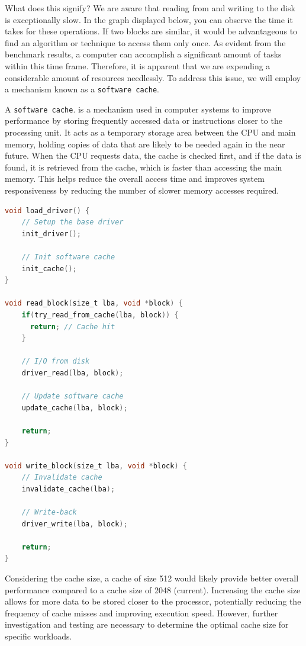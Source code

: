 What does this signify? We are aware that reading from and writing to the disk is exceptionally slow. In the graph displayed below, you can observe the time it takes for these operations. If two blocks are similar, it would be advantageous to find an algorithm or technique to access them only once. As evident from the benchmark results, a computer can accomplish a significant amount of tasks within this time frame. Therefore, it is apparent that we are expending a considerable amount of resources needlessly. To address this issue, we will employ a mechanism known as a \texttt{software cache}.

A \texttt{software cache}. is a mechanism used in computer systems to improve performance by storing frequently accessed data or instructions closer to the processing unit. It acts as a temporary storage area between the CPU and main memory, holding copies of data that are likely to be needed again in the near future. When the CPU requests data, the cache is checked first, and if the data is found, it is retrieved from the cache, which is faster than accessing the main memory. This helps reduce the overall access time and improves system responsiveness by reducing the number of slower memory accesses required.

\begin{lstlisting}[caption={Wrapper around the driver},captionpos=b,language=C,frame=single,breaklines]
void load_driver() {
    // Setup the base driver
    init_driver();
    
   	// Init software cache
    init_cache();  
}

void read_block(size_t lba, void *block) {
    if(try_read_from_cache(lba, block)) {
      return; // Cache hit
    }

    // I/O from disk
    driver_read(lba, block);

    // Update software cache
    update_cache(lba, block);

    return;
}

void write_block(size_t lba, void *block) {
	// Invalidate cache
    invalidate_cache(lba);
  
    // Write-back
    driver_write(lba, block);
  
    return;
}
\end{lstlisting}

Considering the cache size, a cache of size 512 would likely provide better overall performance compared to a cache size of 2048 (current). Increasing the cache size allows for more data to be stored closer to the processor, potentially reducing the frequency of cache misses and improving execution speed. However, further investigation and testing are necessary to determine the optimal cache size for specific workloads.

